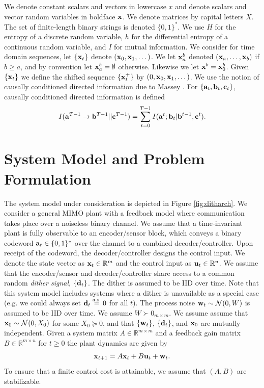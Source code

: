 \documentclass[letterpaper, 10 pt, conference]{ieeeconf}  %
\newcommand{\rvec}[1]{{\mathbf{\MakeLowercase{#1}}}}
\newcommand{\rs}[1]{\mathbf{\MakeLowercase{#1}}}
\newcommand{\dvec}[1]{{#1}}
\begin{document}
We denote constant scalars and vectors in lowercase $x$ and denote scalars and vector random variables in boldface $\rs{x}$. We denote matrices by capital letters $X$. The set of finite-length binary strings is denoted $\{0,1\}^*$. We use $H$ for the entropy of a discrete random variable, $h$ for the differential entropy of a continuous random variable, and $I$ for mutual information. We consider for time domain sequences, let $\{\rs{x}_{t}\}$ denote $(\rs{x}_{0},\rs{x}_{1},\dots)$. We let $\rs{x}_{a}^{b}$ denoted $(\rs{x}_{a},\dots,\rs{x}_{b})$ if $b\ge a$, and by convention let $\rs{x}_{a}^{b}=\emptyset$ otherwise. Likewise we let $\rs{x}^{b}= \rs{x}_{0}^{b}$. Given $\{\rs{x}_{t}\}$ we define the shifted sequence $\{\rs{x}_{t}^{+}\}$ by $(0,\rs{x}_{0},\rs{x}_1,\dots)$. We use the notion of causally conditioned directed information due to Massey 
\cite{masseyDI}. For $\{\rs{a}_{t},\rs{b}_{t},\rs{c}_{t}\}$, causally conditioned directed information is defined
\begin{align}\label{eq:didef}
    I(\rs{a}^{T-1}\rightarrow \rs{b}^{T-1}||\rs{c}^{T-1}) = \sum_{t=0}^{T-1}I(\rs{a}^{t};\rs{b}_{t}|\rs{b}^{t-1},\rs{c}^{t}).
\end{align}


\section{System Model and Problem Formulation}\label{sec:systemmodel}
The system model under consideration is depicted in Figure \ref{fig:ditharch}. We consider a general MIMO plant with a feedback model where communication takes place over a noiseless binary channel. We assume that a time-invariant plant is fully observable to an encoder/sensor block, which conveys a binary codeword $\rvec{a}_{t}\in\{0,1\}^*$ over the channel to a combined decoder/controller. Upon receipt of the codeword, the decoder/controller designs the control input. We denote the state vector as $\rvec{x}_t\in \mathbb{R}^{m}$ and the control input as $\rvec{u}_{t}\in\mathbb{R}^{u}$. We assume that the encoder/sensor and decoder/controller share access to a common random \textit{dither signal}, $\{\rs{d}_{t}\}$. The dither is assumed to be IID over time. Note that this system model includes systems where a dither is unavailable as a special case (e.g. we could always set $\rs{d}_{t}\overset{\mathrm{a.s.}}{=}0$ for all $t$). The process noise $\rvec{w}_{t}\sim\mathcal{N}(\dvec{0},{W})$ is assumed to be IID over time. We assume ${W}\succ{0}_{m\times m}$. We assume assume that $\rvec{x}_{0}\sim\mathcal{N}(\dvec{0},{X}_0)$ for some $X_0\succeq 0$, and that $\{\rs{w}_{t}\}$, $\{\rs{d}_{t}\}$, and $\rs{x}_{0}$ are mutually independent. Given a system matrix ${A}\in\mathbb{R}^{m\times m}$ and a feedback gain matrix ${B}\in\mathbb{R}^{m\times u}$ for $t\ge 0$ the plant dynamics are given by
\begin{align}\label{eq:ssmodel}
    \rvec{x}_{t+1} = {A}\rvec{x}_{t}+{B}\rvec{u}_{t}+\rvec{w}_{t}. 
\end{align} To ensure that a finite control cost is attainable, we assume that $({A},{B})$ are stabilizable.
\end{document}
